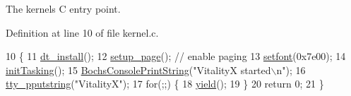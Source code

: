 The kernels C entry point. 



Definition at line 10 of file kernel.\+c.


\begin{DoxyCode}
10              \{
11     \hyperlink{a00023_a4c38e3f3ee100ca4323081bf0970c1ac_a4c38e3f3ee100ca4323081bf0970c1ac}{dt\_install}();
12     \hyperlink{a00074_a51f6a37816540dea572d38f2713e9f5a_a51f6a37816540dea572d38f2713e9f5a}{setup\_page}(); \textcolor{comment}{// enable paging}
13     \hyperlink{a00014_abb01dc16ea34f0a6de3d10d732b6c536_abb01dc16ea34f0a6de3d10d732b6c536}{setfont}(0x7e00);
14     \hyperlink{a00044_aea945e91746a54801f4763ad264746b9_aea945e91746a54801f4763ad264746b9}{initTasking}();
15     \hyperlink{a00029_a19e1f554d03c977f8b947f21489daa41_a19e1f554d03c977f8b947f21489daa41}{BochsConsolePrintString}(\textcolor{stringliteral}{"VitalityX started\(\backslash\)n"});
16     \hyperlink{a00107_ade960b1320324706aac6c00cc6b1b2fe_ade960b1320324706aac6c00cc6b1b2fe}{tty\_pputstring}(\textcolor{stringliteral}{"VitalityX"});
17     \textcolor{keywordflow}{for}(;;) \{
18         \hyperlink{a00044_a58c8b2ad0ea491a6642e5e1cbd358c89_a58c8b2ad0ea491a6642e5e1cbd358c89}{yield}();
19     \}
20     \textcolor{keywordflow}{return} 0;
21 \}
\end{DoxyCode}
